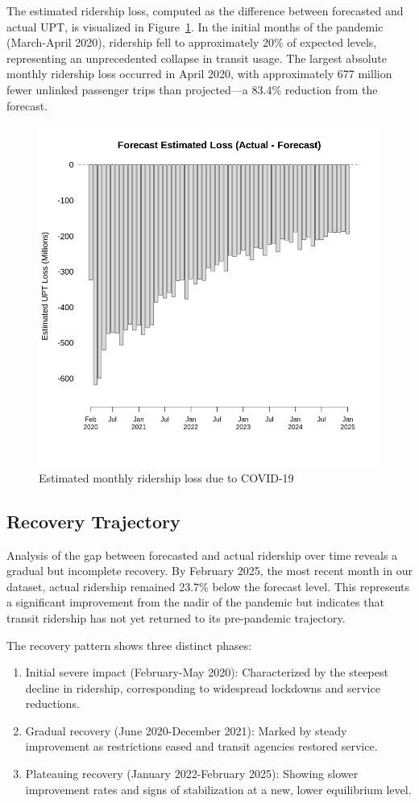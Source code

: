 \documentclass[11pt]{article}
\begin{document}
The estimated ridership loss, computed as the difference between forecasted and actual UPT, is visualized in Figure~\ref{f:loss}. In the initial months of the pandemic (March-April 2020), ridership fell to approximately 20\% of expected levels, representing an unprecedented collapse in transit usage. The largest absolute monthly ridership loss occurred in April 2020, with approximately 677 million fewer unlinked passenger trips than projected—a 83.4\% reduction from the forecast.

\begin{figure}[!ht]
\centering
\includegraphics[width=0.525\linewidth]{estimated_loss.png}
\caption{Estimated monthly ridership loss due to COVID-19}
\label{f:loss}
\end{figure}

\subsection{Recovery Trajectory}

Analysis of the gap between forecasted and actual ridership over time reveals a gradual but incomplete recovery. By February 2025, the most recent month in our dataset, actual ridership remained 23.7\% below the forecast level. This represents a significant improvement from the nadir of the pandemic but indicates that transit ridership has not yet returned to its pre-pandemic trajectory.

The recovery pattern shows three distinct phases:
\begin{enumerate}
  \item Initial severe impact (February-May 2020): Characterized by the steepest decline in ridership, corresponding to widespread lockdowns and service reductions.
  \item Gradual recovery (June 2020-December 2021): Marked by steady improvement as restrictions eased and transit agencies restored service.
  \item Plateauing recovery (January 2022-February 2025): Showing slower improvement rates and signs of stabilization at a new, lower equilibrium level.
\end{enumerate}
\end{document}
